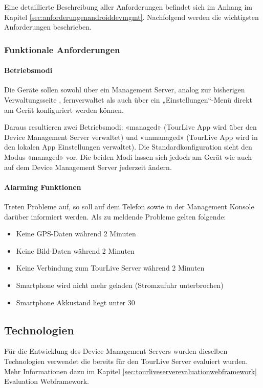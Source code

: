 Eine detaillierte Beschreibung aller Anforderungen befindet sich im Anhang im Kapitel  \ref{sec:anforderungenandroiddevmgmt}. Nachfolgend werden die wichtigsten Anforderungen beschrieben.

\subsubsection{Funktionale Anforderungen}
\paragraph{Betriebsmodi}
Die Geräte sollen sowohl über ein Management Server, analog zur bisherigen Verwaltungsseite , fernverwaltet als auch über ein „Einstellungen“-Menü direkt am Gerät konfiguriert werden können. 

Daraus resultieren zwei Betriebsmodi: «managed» (TourLive App wird über den Device Management Server verwaltet) und «unmanaged» (TourLive App wird in den lokalen App Einstellungen verwaltet). Die Standardkonfiguration sieht den Modus «managed» vor. Die beiden Modi lassen sich jedoch am Gerät wie auch auf dem Device Management Server jederzeit ändern. 


\paragraph{Alarming Funktionen}
Treten Probleme auf, so soll auf dem Telefon sowie in der Management Konsole darüber informiert werden. Als zu meldende Probleme gelten folgende:
\begin{itemize}
\item Keine GPS-Daten während 2 Minuten
\item Keine Bild-Daten während 2 Minuten
\item Keine Verbindung zum TourLive Server während 2 Minuten
\item Smartphone wird nicht mehr geladen (Stromzufuhr unterbrochen)
\item Smartphone Akkustand liegt unter 30%
\end{itemize}
	
\subsection{Technologien}
Für die Entwicklung des Device Management Servers wurden dieselben Technologien verwendet die bereits für den TourLive Server evaluiert wurden. Mehr Informationen dazu im Kapitel  \ref{sec:tourliveserverevaluationwebframework} Evaluation Webframework.


